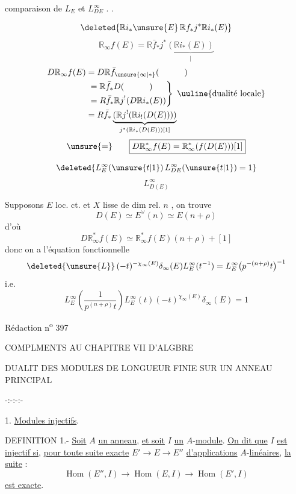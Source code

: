 comparaison  de $L_E$ et $L_{DE}^{\infty}$ . .

\[
\deleted{\mathbb R i_*\unsure{E}\,\mathbb R f_*j^*\mathbb R i_*(E)}
\]
\[
\mathbb R_\infty f(E)=\mathbb R\bar f_*j^*\underbrace{(\mathbb R i_*(E))}_{\big|} 
\]
\[
\begin{aligned}
D\mathbb R_\infty f(E)&=D\mathbb R\bar f_{\unsure{\infty|*}}(\hspace{3em})\\
&\left.\begin{aligned}
&=\mathbb R\bar f_*D(\hspace{3em})\\
&=R\bar f_*\mathbb R j^!(D\mathbb R i_*(E))
\end{aligned}\right\}\ \text{\uuline{dualité locale}}\\
&=R\bar f_*\underbrace{(\mathbb R j^!(\mathbb R i_!(D(E))))}_{j^*(\mathbb R i_*(D(E)))[1]}
\end{aligned}
\]
\[
\unsure{=}\qquad\boxed{D\mathbb R_\infty^* f(E)=\mathbb R_\infty^*(f(D(E)))[1]}
\]

\[
\deleted{L_E^\infty(\unsure{t|1})\,L_{DE}^\infty(\unsure{t|1})=1}
\]
\[
L_{D(E)}^\infty
\]

Supposons $E$ loc. ct.  et $X$ lisse de dim rel. $n$ , on trouve
\[
D(E)\simeq E^\vee(n)\simeq E(n+\rho)
\]
d'où
\[
\boxed{D\mathbb R_\infty^* f(E)\simeq\mathbb R_\infty^* f(E)(n+\rho)+[1]}
\]
donc on a l'équation fonctionnelle
\[
\deleted{\unsure{L}}\,(-t)^{-\chi_\infty(E)}\delta_\infty(E)L_E^\infty(t^{-1})=L_E^\infty\bigl(p^{-(n+\rho)}t\bigr)^{-1}
\]
i.e.
\[
\boxed{L_E^\infty\left(\frac{1}{p^{(n+\rho)}t}\right)L_E^\infty(t)(-t)^{\chi_\infty(E)}\delta_\infty(E)=1}
\]

Rédaction n\textsuperscript{o} 397

COMPLMENTS AU CHAPITRE VII D'ALGBRE

DUALIT DES MODULES DE LONGUEUR FINIE SUR UN ANNEAU PRINCIPAL

\begin{center}-:-:-:-\end{center}

1. \uline{Modules injectifs}.

DEFINITION 1.- \uline{Soit} $A$ \uline{un anneau}, \uline{et soit} $I$ \uline{un} $A$-\uline{module}. \uline{On dit que} $I$ \uline{est injectif si}, \uline{pour toute suite exacte} $E'\longrightarrow E\longrightarrow E''$ \uline{d'applications} $A$-\uline{linéaires}, \uline{la suite} :
\[
\operatorname{Hom}(E'',I)\longrightarrow\operatorname{Hom}(E,I)\longrightarrow\operatorname{Hom}(E',I)
\]
\uline{est exacte}.

